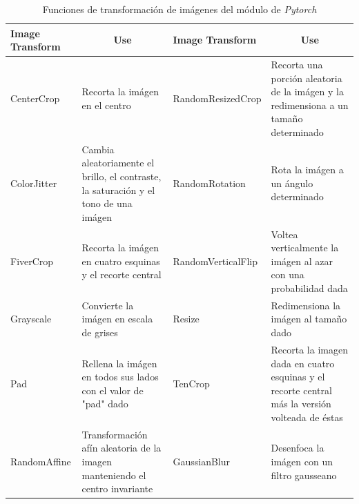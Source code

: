 			\begin{table}[ht]
				\centering
				\begin{tabular}{|p{4cm}|p{4cm}|p{4cm}|p{4cm}|}
					\hline
					Image Transform       & \multicolumn{1}{c|}{Use}                                                               & Image Transform       & \multicolumn{1}{c|}{Use}                                                                        \\ \hline
					CenterCrop            & Recorta la imágen en el centro                                                         & RandomResizedCrop     & Recorta una porción aleatoria de la imágen y la redimensiona a un tamaño determinado            \\ \hline
					ColorJitter           & Cambia aleatoriamente el brillo, el contraste, la saturación y el tono de una imágen   & RandomRotation        & Rota la imágen a un ángulo determinado                                                          \\ \hline
					FiverCrop              & Recorta la imágen en cuatro esquinas y el recorte central                              & RandomVerticalFlip    & Voltea verticalmente la imágen al azar con una probabilidad dada                                \\ \hline
					Grayscale             & Convierte la imágen en escala de grises                                                & Resize                & Redimensiona la imágen al tamaño dado                                                           \\ \hline
					Pad                   & Rellena la imágen en todos sus lados con el valor de "pad" dado                        & TenCrop               & Recorta la imagen dada en cuatro esquinas y el recorte central más la versión volteada de éstas \\ \hline
					RandomAffine          & Transformación afín aleatoria de la imagen manteniendo el centro invariante            & GaussianBlur          & Desenfoca la imágen con un filtro gausseano                                                                                                                                                     \\ \hline
				\end{tabular}
				\caption{Funciones de transformación de imágenes del módulo de \textit{Pytorch}}
				\label{table:Filters1}
			\end{table}
			
